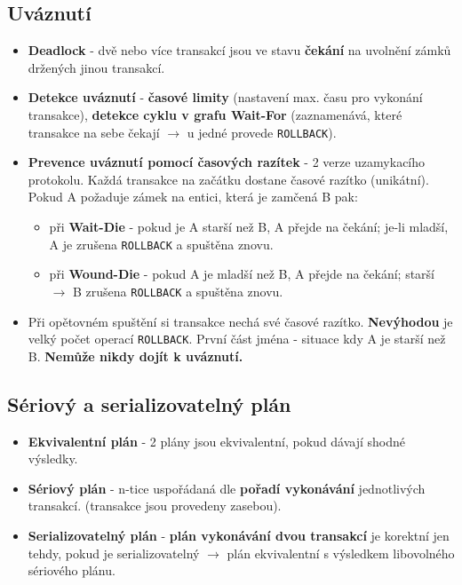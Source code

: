 \subsection{Uváznutí}
\begin{itemize}
\item \textbf{Deadlock} - dvě nebo více transakcí jsou ve stavu \textbf{čekání} na uvolnění zámků držených jinou transakcí.
\item \textbf{Detekce uváznutí} - \textbf{časové limity} (nastavení max. času pro vykonání transakce), \textbf{detekce cyklu v grafu Wait-For} (zaznamenává, které transakce na sebe čekají $\rightarrow$ u jedné provede \texttt{ROLLBACK}).
\item \textbf{Prevence uváznutí pomocí časových razítek} - 2 verze uzamykacího protokolu. Každá transakce na začátku dostane časové razítko (unikátní). Pokud A požaduje zámek na entici, která je zamčená B pak:
\begin{itemize}
\item při \textbf{Wait-Die} - pokud je A starší než B, A přejde na čekání; je-li mladší, A je zrušena \texttt{ROLLBACK} a spuštěna znovu.
\item při \textbf{Wound-Die} - pokud A je mladší než B, A přejde na čekání; starší $\rightarrow$ B zrušena \texttt{ROLLBACK} a spuštěna znovu.
\end{itemize}
\item Při opětovném spuštění si transakce nechá své časové razítko. \textbf{Nevýhodou} je velký počet operací \texttt{ROLLBACK}. První část jména - situace kdy A je starší než B. \textbf{Nemůže nikdy dojít k uváznutí.}
\end{itemize}

\subsection{Sériový a serializovatelný plán}
\begin{itemize}
\item \textbf{Ekvivalentní plán} - 2 plány jsou ekvivalentní, pokud dávají shodné výsledky.
\item \textbf{Sériový plán} - n-tice uspořádaná dle \textbf{pořadí vykonávání} jednotlivých transakcí. (transakce jsou provedeny zasebou).
\item \textbf{Serializovatelný plán} - \textbf{plán vykonávání dvou transakcí} je korektní jen tehdy, pokud je serializovatelný $\rightarrow$ plán ekvivalentní s výsledkem libovolného sériového plánu.
\end{itemize}

